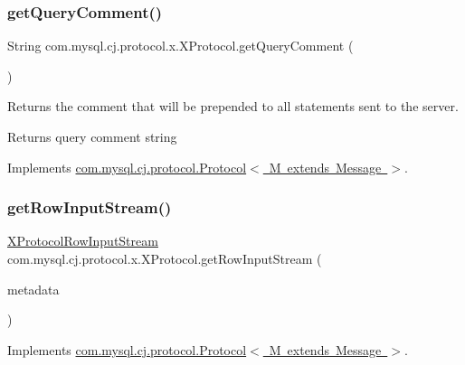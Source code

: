 \subsubsection{\texorpdfstring{get\+Query\+Comment()}{getQueryComment()}}
{\footnotesize\ttfamily String com.\+mysql.\+cj.\+protocol.\+x.\+X\+Protocol.\+get\+Query\+Comment (\begin{DoxyParamCaption}{ }\end{DoxyParamCaption})}

Returns the comment that will be prepended to all statements sent to the server.

\begin{DoxyReturn}{Returns}
query comment string 
\end{DoxyReturn}


Implements \mbox{\hyperlink{interfacecom_1_1mysql_1_1cj_1_1protocol_1_1_protocol_a8a25c27a012f47ca25de357e65829884}{com.\+mysql.\+cj.\+protocol.\+Protocol$<$ M extends Message $>$}}.

\mbox{\label{classcom_1_1mysql_1_1cj_1_1protocol_1_1x_1_1_x_protocol_a42d0005d5123c6c54913d499ab69fbf5}} 
\subsubsection{\texorpdfstring{get\+Row\+Input\+Stream()}{getRowInputStream()}}
{\footnotesize\ttfamily \mbox{\hyperlink{classcom_1_1mysql_1_1cj_1_1protocol_1_1x_1_1_x_protocol_row_input_stream}{X\+Protocol\+Row\+Input\+Stream}} com.\+mysql.\+cj.\+protocol.\+x.\+X\+Protocol.\+get\+Row\+Input\+Stream (\begin{DoxyParamCaption}\item[{\mbox{\hyperlink{interfacecom_1_1mysql_1_1cj_1_1protocol_1_1_column_definition}{Column\+Definition}}}]{metadata }\end{DoxyParamCaption})}



Implements \mbox{\hyperlink{interfacecom_1_1mysql_1_1cj_1_1protocol_1_1_protocol_a9e859d7ef531819c5bdef288f650ab83}{com.\+mysql.\+cj.\+protocol.\+Protocol$<$ M extends Message $>$}}.

